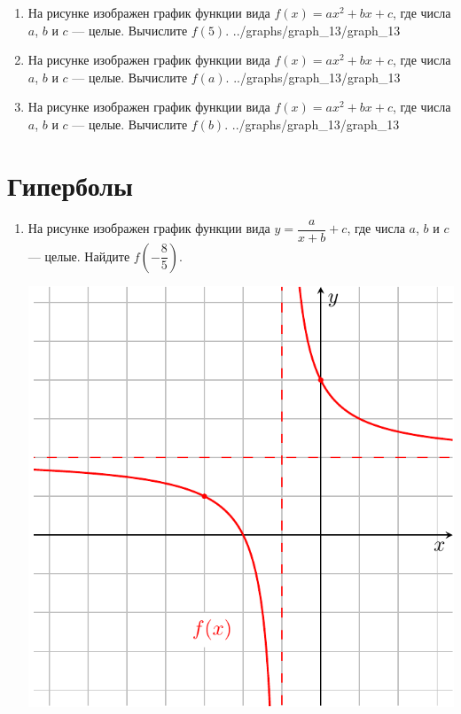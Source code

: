 \documentclass[10pt, a4paper]{article}
\begin{document}
\begin{enumerate}
		{../graphs/graph_12/graph_12}
	\item \funcexer
		{На рисунке изображен график функции вида $f(x)=ax^2+bx+c$, где числа $a$, $b$ и $c$ — целые. Вычислите $f(5)$. }
		{../graphs/graph_13/graph_13}
	\item \funcexer
		{На рисунке изображен график функции вида $f(x)=ax^2+bx+c$, где числа $a$, $b$ и $c$ — целые. Вычислите $f(a)$. }
		{../graphs/graph_13/graph_13}
	\item \funcexer
		{На рисунке изображен график функции вида $f(x)=ax^2+bx+c$, где числа $a$, $b$ и $c$ — целые. Вычислите $f(b)$. }
		{../graphs/graph_13/graph_13}
\end{enumerate}
\section{Гиперболы}
\begin{enumerate}
	\item 
	\begin{minipage}[t]{0.6\textwidth}
		На рисунке изображен график функции вида $y=\dfrac{a}{x+b}+c$, где числа $a$, $b$ и $c$ — целые. Найдите $f\left(-\dfrac{8}{5}\right)$.
		\begin{flushright}
		\end{flushright}
	\end{minipage}
	\begin{minipage}[t]{0.3\textwidth}
		\hspace{10pt}
		\includegraphics[align=t, width=\textwidth]{graphs/graph_2/graph_2}
	\end{minipage}
	
\end{enumerate}
\end{document}
